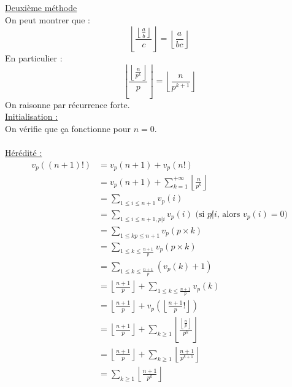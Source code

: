 \documentclass{report}
\begin{document}
\begin{enumerate}
    \noindent \underline{Deuxième méthode} \\
    On peut montrer que : 
    $$\left\lfloor \frac{\left\lfloor \frac{a}{b} \right\rfloor}{c} \right\rfloor = \left\lfloor \frac{a}{bc} \right\rfloor$$
    En particulier : 
    $$\left\lfloor \frac{\left\lfloor \frac{n}{p^k} \right\rfloor}{p} \right\rfloor = \left\lfloor \frac{n}{p^{k+1}} \right\rfloor$$
    On raisonne par récurrence forte. \\
    \underline{Initialisation :} \\
    On vérifie que ça fonctionne pour $n=0$. \\ \\
    \noindent \underline{Hérédité :}
    \begin{align*}
        v_p((n+1)!) &= v_p(n+1) + v_p(n!) \\
        &= v_p(n+1) + \sum_{k=1}^{+\infty} \left\lfloor \frac{n}{p^k} \right\rfloor \\
        &= \sum_{1 \leq i \leq n+1} v_p(i) \\
        &= \sum_{1 \leq i \leq n+1, p|i} v_p(i) \text{ (si $p \not | i$, alors $v_p(i) = 0$)} \\
        &= \sum_{1 \leq kp \leq n+1} v_p(p \times k) \\
        &= \sum_{1 \leq k \leq \frac{n+1}{p}} v_p(p \times k) \\
        &= \sum_{1 \leq k \leq \frac{n+1}{p}} (v_p(k) + 1) \\
        &= \left\lfloor \frac{n+1}{p} \right\rfloor + \sum_{1 \leq k \leq \frac{n+1}{p}} v_p(k) \\
        &= \left\lfloor \frac{n+1}{p} \right\rfloor + v_p \left( \left\lfloor \frac{n+1}{p}! \right\rfloor \right) \\
        &= \left\lfloor \frac{n+1}{p} \right\rfloor + \sum_{k \geq 1} \left\lfloor \frac{\left\lfloor \frac{n}{p} \right\rfloor}{p^k} \right\rfloor \\
        &= \left\lfloor \frac{n+1}{p} \right\rfloor + \sum_{k \geq 1} \left\lfloor \frac{n+1}{p^{k+1}} \right\rfloor \\
        &= \sum_{k \geq 1} \left\lfloor \frac{n+1}{p^k} \right\rfloor
    \end{align*}


\end{enumerate}
\end{document}
